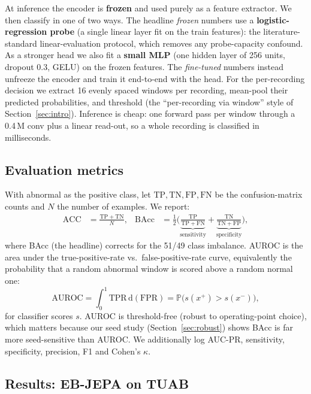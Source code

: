 \documentclass[10pt,a4paper]{article}
\begin{document}
At inference the encoder is \textbf{frozen} and used purely as a feature extractor. We then classify in one
of two ways. The headline \emph{frozen} numbers use a \textbf{logistic-regression probe} (a single linear
layer fit on the train features): the literature-standard linear-evaluation protocol, which removes any
probe-capacity confound. As a stronger head we also fit a \textbf{small MLP} (one hidden layer of 256 units,
dropout 0.3, GELU) on the frozen features. The \emph{fine-tuned} numbers instead unfreeze the encoder and
train it end-to-end with the head. For the per-recording decision we extract 16 evenly spaced windows per
recording, mean-pool their predicted probabilities, and threshold (the ``per-recording via window'' style of
Section~\ref{sec:intro}). Inference is cheap: one forward pass per window through a 0.4\,M conv plus a linear
read-out, so a whole recording is classified in milliseconds.

\subsection{Evaluation metrics}
\label{sec:eval}

With abnormal as the positive class, let $\mathrm{TP,TN,FP,FN}$ be the confusion-matrix counts and
$N$ the number of examples. We report:
\begin{align}
\mathrm{ACC} &= \frac{\mathrm{TP}+\mathrm{TN}}{N}, &
\mathrm{BAcc} &= \tfrac12\Big(\underbrace{\tfrac{\mathrm{TP}}{\mathrm{TP}+\mathrm{FN}}}_{\text{sensitivity}} + \underbrace{\tfrac{\mathrm{TN}}{\mathrm{TN}+\mathrm{FP}}}_{\text{specificity}}\Big),
\end{align}
where BAcc (the headline) corrects for the 51/49 class imbalance. AUROC is the area under the
true-positive-rate vs.\ false-positive-rate curve, equivalently the probability that a random abnormal window
is scored above a random normal one:
\begin{equation}
\mathrm{AUROC} = \int_0^1 \mathrm{TPR}\,\mathrm{d(FPR)} = \mathbb{P}\big(s(x^+) > s(x^-)\big),
\end{equation}
for classifier scores $s$. AUROC is threshold-free (robust to operating-point choice), which matters because
our seed study (Section~\ref{sec:robust}) shows BAcc is far more seed-sensitive than AUROC. We additionally
log AUC-PR, sensitivity, specificity, precision, F1 and Cohen's $\kappa$.

\subsection{Results: EB-JEPA on TUAB}
\label{sec:results}
\end{document}
